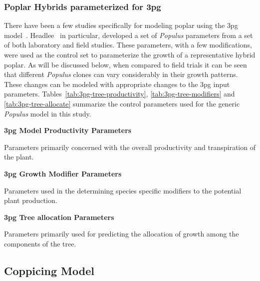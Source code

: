 \documentclass[10pt]{article}
\newcommand{\pop}{\textit{Populus} }
\begin{document}
\subsubsection*{Poplar Hybrids parameterized for \ac{3pg}}

There have been a few studies specifically for modeling poplar using the
\ac{3pg} model~\cite{Amichev2010,Headlee2012}.  Headlee~\cite{Headlee2012} in
particular, developed a set of \pop parameters from a set of both laboratory and
field studies.  These parameters, with a few modifications, were used as the
control set to parameterize the growth of a representative hybrid poplar.  As
will be discussed below, when compared to field trials it can be seen that
different \pop clones can vary considerably in their growth patterns.  These
changes can be modeled with appropriate changes to the \ac{3pg} input
parameters.  Tables~\ref{tab:3pg-tree-productivity},
\ref{tab:3pg-tree-modifiers} and \ref{tab:3pg-tree-allocate} summarize the
control parameters used for the generic \pop model in this study.

\begin{table}[!ht]
\caption{\textbf{\ac{3pg} Model Productivity Parameters}}

\begin{flushleft}Parameters primarily concerned with the overall productivity and transpiration of the plant.
\end{flushleft}
\label{tab:3pg-tree-productivity}
 \end{table}

\begin{table}[!ht]
\caption{\textbf{\ac{3pg} Growth Modifier Parameters}}

\begin{flushleft}Parameters used in the determining species specific modifiers to the potential plant production.
\end{flushleft}
\label{tab:3pg-tree-modifiers}
 \end{table}

\begin{table}[!ht]
\caption{\textbf{\ac{3pg} Tree allocation Parameters}}

\begin{flushleft}Parameters primarily used for predicting the allocation of growth among the components of the tree.
\end{flushleft}
\label{tab:3pg-tree-allocate}
 \end{table}

\subsection*{Coppicing Model}
\label{sec:coppicing-model}
\end{document}
